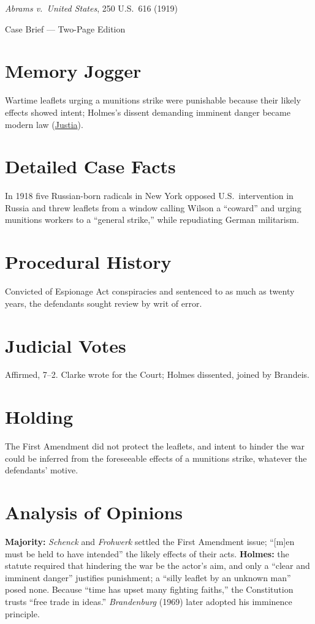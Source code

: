 \documentclass[12pt]{article}
\begin{document}
\begin{center}
{\LARGE \textit{Abrams v.\ United States}, 250 U.S.\ 616 (1919)\par}
\vspace{0.5em}
{\large Case Brief --- Two-Page Edition\par}
\end{center}

\section{Memory Jogger}
Wartime leaflets urging a munitions strike were punishable because their likely effects showed intent; Holmes's dissent demanding imminent danger became modern law (\href{https://supreme.justia.com/cases/federal/us/250/616/}{Justia}).

\section{Detailed Case Facts}
In 1918 five Russian-born radicals in New York opposed U.S.\ intervention in Russia and threw leaflets from a window calling Wilson a ``coward'' and urging munitions workers to a ``general strike,'' while repudiating German militarism.

\section{Procedural History}
Convicted of Espionage Act conspiracies and sentenced to as much as twenty years, the defendants sought review by writ of error.

\section{Judicial Votes}
Affirmed, 7--2. Clarke wrote for the Court; Holmes dissented, joined by Brandeis.

\section{Holding}
The First Amendment did not protect the leaflets, and intent to hinder the war could be inferred from the foreseeable effects of a munitions strike, whatever the defendants' motive.

\section{Analysis of Opinions}
\textbf{Majority:} \textit{Schenck} and \textit{Frohwerk} settled the First Amendment issue; ``[m]en must be held to have intended'' the likely effects of their acts. \textbf{Holmes:} the statute required that hindering the war be the actor's aim, and only a ``clear and imminent danger'' justifies punishment; a ``silly leaflet by an unknown man'' posed none. Because ``time has upset many fighting faiths,'' the Constitution trusts ``free trade in ideas.'' \textit{Brandenburg} (1969) later adopted his imminence principle.
\end{document}
